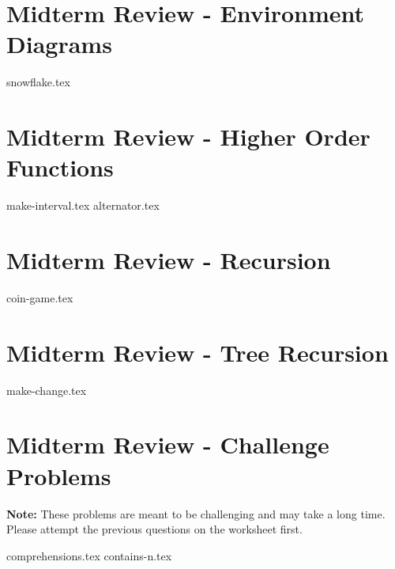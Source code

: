 \documentclass{exam}
\begin{document}
\newpage
\section{Midterm Review - Environment Diagrams}
\begin{questions}
{snowflake.tex}
\end{questions}

\newpage
\section{Midterm Review - Higher Order Functions}
\begin{questions}
{make-interval.tex}
{alternator.tex}
\end{questions}

\section{Midterm Review - Recursion}
\begin{questions}
{coin-game.tex}
\end{questions}

\section{Midterm Review - Tree Recursion}
\begin{questions}
{make-change.tex}
\end{questions}

\newpage
\section{Midterm Review - Challenge Problems}
\textbf{Note:} These problems are meant to be challenging and may take a long time. Please attempt the previous questions on the worksheet first.
\begin{questions}
{comprehensions.tex}
\newpage
{contains-n.tex}
\end{questions}
\end{document}
